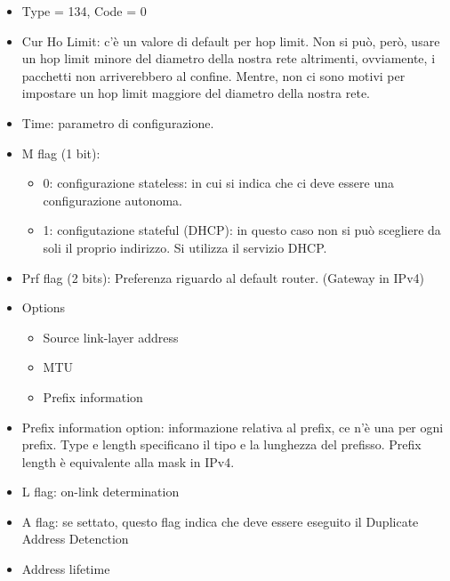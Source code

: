 \documentclass{article}
\begin{document}
\begin{itemize}
    \item Type = 134, Code = 0
    \item Cur Ho Limit: c'è un valore di default per hop limit. Non si può, però, usare un hop limit minore del diametro della nostra rete altrimenti, ovviamente, i pacchetti non arriverebbero al confine. Mentre, non ci sono motivi per impostare un hop limit maggiore del diametro della nostra rete.
    \item Time: parametro di configurazione.
    \item M flag (1 bit): 
        \begin{itemize}
            \item 0: configurazione stateless: in cui si indica che ci deve essere una configurazione autonoma.
            \item 1: configutazione stateful (DHCP): in questo caso non si può scegliere da soli il proprio indirizzo. Si utilizza il servizio DHCP.
        \end{itemize}
    \item Prf flag (2 bits): Preferenza riguardo al default router. (Gateway in IPv4)
    \item Options
        \begin{itemize}
            \item Source link-layer address
            \item MTU
            \item Prefix information
        \end{itemize}
    \item Prefix information option: informazione relativa al prefix, ce n'è una per ogni prefix. Type e length specificano il tipo e la lunghezza del prefisso. Prefix length è equivalente alla mask in IPv4.
    \item L flag: on-link determination
    \item A flag: se settato, questo flag indica che deve essere eseguito il Duplicate Address Detenction
    \item Address lifetime
\end{itemize}
\end{document}
